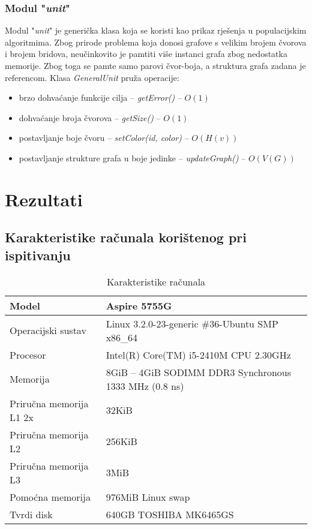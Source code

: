 \documentclass[times, utf8, diplomski, numeric]{fer}
\begin{document}
\subsection{Modul "\emph{unit}"}

Modul "\emph{unit}" je generička klasa koja se koristi kao prikaz rješenja u populacijskim algoritmima. Zbog prirode problema koja donosi grafove s velikim brojem čvorova i brojem bridova, neučinkovito je pamtiti više instanci grafa zbog nedostatka memorije. Zbog toga se pamte samo parovi čvor-boja, a struktura grafa zadana je referencom. Klasa \emph{GeneralUnit} pruža operacije: 

\begin{itemize}
	\item brzo dohvaćanje funkcije cilja -- \emph{getError()} -- $O(1)$
	\item dohvaćanje broja čvorova -- \emph{getSize()} -- $O(1)$
	\item postavljanje boje čvoru -- \emph{setColor(id, color)} -- $O(H(v))$
	\item postavljanje strukture grafa u boje jedinke -- \emph{updateGraph()} -- $O(V(G))$
\end{itemize}

\chapter{Rezultati}

\section{Karakteristike računala korištenog pri ispitivanju}

\begin{table}[htb]
	\caption{Karakteristike računala}
	\label{tbl:karakteristike-PC}
	\centering
	\begin{tabular}{|l|l|} \hline
		Model & Aspire 5755G \\ \hline
		Operacijski sustav & Linux 3.2.0-23-generic \#36-Ubuntu SMP x86\_64 \\ \hline
		Procesor & Intel(R) Core(TM) i5-2410M CPU \@ 2.30GHz \\ \hline
		Memorija & 8GiB -- 4GiB SODIMM DDR3 Synchronous 1333 MHz (0.8 ns) \\ \hline
		Priručna memorija L1 2x & 32KiB \\ \hline
		Priručna memorija L2 & 256KiB \\ \hline
		Priručna memorija L3 & 3MiB \\ \hline
		Pomoćna memorija & 976MiB Linux swap \\ \hline
		Tvrdi disk & 640GB TOSHIBA MK6465GS \\ \hline
	\end{tabular}
\end{table}
\end{document}

